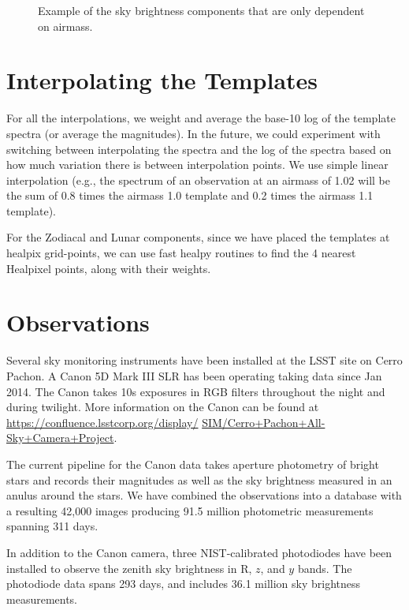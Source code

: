 \documentclass{emulateapj}  %
\begin{document}
\begin{figure}
  \caption{Example of the sky brightness components that are only dependent on airmass.  \label{fig:merged}}
\end{figure}


\section{Interpolating the Templates}

For all the interpolations, we weight and average the base-10 log of the template spectra (or average the magnitudes).  In the future, we could experiment with switching between interpolating the spectra and the log of the spectra based on how much variation there is between interpolation points.  We use simple linear interpolation (e.g., the spectrum of an observation at an airmass of 1.02 will be the sum of 0.8 times the airmass 1.0 template and 0.2 times the airmass 1.1 template). 

For the Zodiacal and Lunar components, since we have placed the templates at healpix grid-points, we can use fast healpy routines to find the 4 nearest Healpixel points, along with their weights.  


\section{Observations}

Several sky monitoring instruments have been installed at the LSST site on Cerro Pachon.  A Canon 5D Mark III SLR has been operating taking data since Jan 2014.  The Canon takes 10s exposures in RGB filters throughout the night and during twilight.  More information on the Canon can be found at \url{https://confluence.lsstcorp.org/display/} \url{SIM/Cerro+Pachon+All-Sky+Camera+Project}.

The current pipeline for the Canon data takes aperture photometry of bright stars and records their magnitudes as well as the sky brightness measured in an anulus around the stars.  We have combined the observations into a database with a resulting 42,000 images producing 91.5 million photometric measurements spanning 311 days.  

In addition to the Canon camera, three NIST-calibrated photodiodes have been installed to observe the zenith sky brightness in R, $z$, and $y$ bands. The photodiode data spans 293 days, and includes 36.1 million sky brightness measurements.
\end{document}
